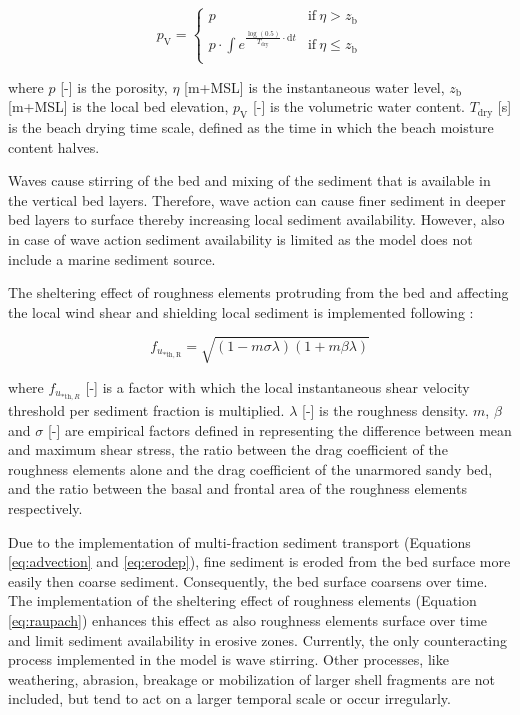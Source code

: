 \documentclass[preprint,12pt,authoryear]{elsarticle}
\begin{document}
\begin{equation}
  \label{eq:drying}
  p_{\mathrm{V}} = \left\{
    \begin{array}{ll}
      p & \mathrm{if} ~ \eta > z_{\mathrm{b}} \\
      p \cdot \int e^{\frac{\log \left( 0.5 \right)}{T_{\mathrm{dry}}} \cdot \mathrm{d} t} & \mathrm{if} ~ \eta \leq z_{\mathrm{b}} \\
    \end{array}
  \right.
\end{equation}

\noindent where $p$ [-] is the porosity, $\eta$ [m+MSL] is the
instantaneous water level, $z_{\mathrm{b}}$ [m+MSL] is the local bed
elevation, $p_{\mathrm{V}}$ [-] is the volumetric water
content. $T_{\mathrm{dry}}$ [s] is the beach drying time scale,
defined as the time in which the beach moisture content halves.

Waves cause stirring of the bed and mixing of the sediment that is
available in the vertical bed layers. Therefore, wave action can cause
finer sediment in deeper bed layers to surface thereby increasing
local sediment availability. However, also in case of wave action
sediment availability is limited as the model does not include a
marine sediment source.

The sheltering effect of roughness elements protruding from the bed
and affecting the local wind shear and shielding local sediment is
implemented following \citet{Raupach1993}:

\begin{equation}
  \label{eq:raupach}
  f_{u_{\mathrm{* th, R}}} = \sqrt{ \left( 1 - m \sigma \lambda \right) \left( 1 + m \beta \lambda \right) }
\end{equation}

\noindent where $f_{u_{\mathrm{* th},R}}$ [-] is a factor with which
the local instantaneous shear velocity threshold per sediment fraction
is multiplied. $\lambda$ [-] is the roughness density. $m$, $\beta$
and $\sigma$ [-] are empirical factors defined in \citet{Raupach1993}
representing the difference between mean and maximum shear stress, the
ratio between the drag coefficient of the roughness elements alone and
the drag coefficient of the unarmored sandy bed, and the ratio between
the basal and frontal area of the roughness elements respectively.

Due to the implementation of multi-fraction sediment transport
(Equations \ref{eq:advection} and \ref{eq:erodep}), fine sediment is
eroded from the bed surface more easily then coarse
sediment. Consequently, the bed surface coarsens over time. The
implementation of the sheltering effect of roughness elements
(Equation \ref{eq:raupach}) enhances this effect as also roughness
elements surface over time and limit sediment availability in erosive
zones. Currently, the only counteracting process implemented in the
model is wave stirring. Other processes, like weathering, abrasion,
breakage or mobilization of larger shell fragments are not included,
but tend to act on a larger temporal scale or occur irregularly.
\end{document}
